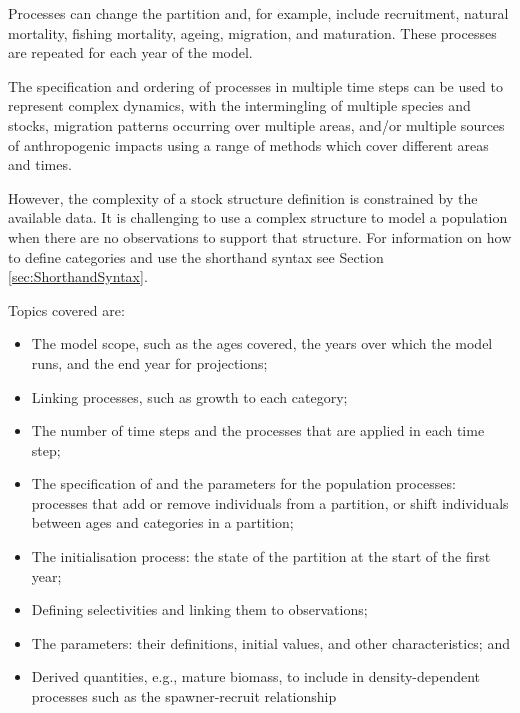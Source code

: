Processes can change the partition and, for example, include recruitment, natural mortality, fishing mortality, ageing, migration, and maturation. These processes are repeated for each year of the model.

The specification and ordering of processes in multiple time steps can be used to represent complex dynamics, with the intermingling of multiple species and stocks, migration patterns occurring over multiple areas, and/or multiple sources of anthropogenic impacts using a range of methods which cover different areas and times.

However, the complexity of a stock structure definition is constrained by the available data. It is challenging to use a complex structure to model a population when there are no observations to support that structure.  For information on how to define categories and use the shorthand syntax see Section \ref{sec:ShorthandSyntax}.

Topics covered are:

\begin{itemize}
	\item The model scope, such as the ages covered, the years over which the model runs, and the end year for projections;
    \item Linking processes, such as growth to each category;
    \item The number of time steps and the processes that are applied in each time step;
    \item The specification of and the parameters for the population processes: processes that add or remove individuals from a partition, or shift individuals between ages and categories in a partition;
    \item The initialisation process: the state of the partition at the start of the first year;
   \item Defining selectivities and linking them to observations;
   \item The parameters: their definitions, initial values, and other characteristics; and
   \item Derived quantities, e.g., mature biomass, to include in density-dependent processes such as the spawner-recruit relationship
\end{itemize}

\subsection{}\label{sec:Model}

